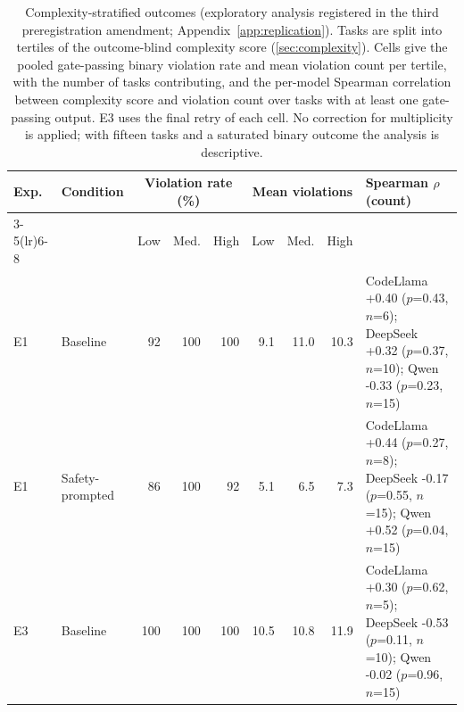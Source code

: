 \begin{table}[t]
\caption{Complexity-stratified outcomes (exploratory analysis registered in the third
preregistration amendment; Appendix~\ref{app:replication}).
Tasks are split into tertiles of the outcome-blind complexity score
(\ref{sec:complexity}). Cells give the pooled gate-passing binary violation rate
and mean violation count per tertile, with the number of tasks contributing, and the
per-model Spearman correlation between complexity score and violation count over
tasks with at least one gate-passing output. E3 uses the final retry of each cell.
No correction for multiplicity is applied; with fifteen tasks and a saturated
binary outcome the analysis is descriptive.}
\label{tab:complexity}
\centering
\scriptsize
\setlength{\tabcolsep}{3pt}
\begin{tabular}{@{}llrrrrrrl@{}}
\toprule
Exp. & Condition & \multicolumn{3}{c}{Violation rate (\%)} & \multicolumn{3}{c}{Mean violations} & Spearman $\rho$ (count) \\
\cmidrule(lr){3-5}\cmidrule(lr){6-8}
 & & Low & Med. & High & Low & Med. & High & \\
\midrule
E1 & Baseline & 92 & 100 & 100 & 9.1 & 11.0 & 10.3 & CodeLlama +0.40 ($p$=0.43, $n$=6); DeepSeek +0.32 ($p$=0.37, $n$=10); Qwen -0.33 ($p$=0.23, $n$=15) \\
E1 & Safety-prompted & 86 & 100 & 92 & 5.1 & 6.5 & 7.3 & CodeLlama +0.44 ($p$=0.27, $n$=8); DeepSeek -0.17 ($p$=0.55, $n$=15); Qwen +0.52 ($p$=0.04, $n$=15) \\
E3 & Baseline & 100 & 100 & 100 & 10.5 & 10.8 & 11.9 & CodeLlama +0.30 ($p$=0.62, $n$=5); DeepSeek -0.53 ($p$=0.11, $n$=10); Qwen -0.02 ($p$=0.96, $n$=15) \\
\bottomrule
\end{tabular}
\end{table}
